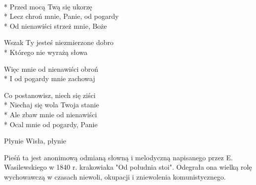 \begin{lyrics}[longestline={Lecz chroń mnie, Panie, od pogardy}]

\\*
Przed mocą Twą się ukorzę\\*
Lecz chroń mnie, Panie, od pogardy\\*
Od nienawiści strzeż mnie, Boże

Wszak Ty jesteś niezmierzone dobro\\*
Którego nie wyrażą słowa

Więc mnie od nienawiści obroń\\*
I od pogardy mnie zachowaj

\begin{markverses}%
Co postanowisz, niech się ziści\\*
Niechaj się wola Twoja stanie\\*
Ale zbaw mnie od nienawiści\\*
Ocal mnie od pogardy, Panie
\end{markverses}
\end{lyrics}



\song
{Płynie Wisła, płynie}
\begin{info}Pieśń ta jest anonimową odmianą słowną i melodyczną napisanego przez E. Wasilewskiego w 1840 r. krakowiaka "Od południa stoi". Odegrała ona wielką rolę wychowawczą w czasach niewoli, okupacji i zniewolenia komunistycznego.\end{info}

